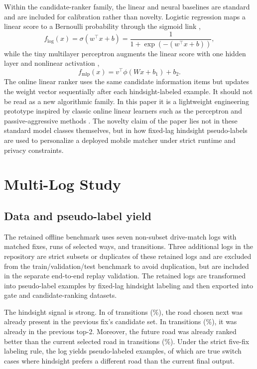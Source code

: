 \documentclass{article}
\begin{document}
Within the candidate-ranker family, the linear and neural baselines are standard and are included for calibration rather than novelty. Logistic regression maps a linear score to a Bernoulli probability through the sigmoid link \cite{cox1958binary},
\[
f_{\mathrm{log}}(x)=\sigma(w^\top x + b)=\frac{1}{1+\exp(-(w^\top x+b))},
\]
while the tiny multilayer perceptron augments the linear score with one hidden layer and nonlinear activation \cite{rumelhart1986backprop},
\[
f_{\mathrm{mlp}}(x)=v^\top \phi(Wx+b_1)+b_2.
\]
The online linear ranker uses the same candidate information items but updates the weight vector sequentially after each hindsight-labeled example. It should not be read as a new algorithmic family. In this paper it is a lightweight engineering prototype inspired by classic online linear learners such as the perceptron \cite{rosenblatt1958perceptron} and passive-aggressive methods \cite{crammer2006pa}. The novelty claim of the paper lies not in these standard model classes themselves, but in how fixed-lag hindsight pseudo-labels are used to personalize a deployed mobile matcher under strict runtime and privacy constraints.

\section{Multi-Log Study}
\subsection{Data and pseudo-label yield}
The retained offline benchmark uses seven non-subset drive-match logs with \CurrentLogRows{} matched fixes, \CurrentLogRunCount{} runs of selected ways, and \CurrentLogTransitions{} transitions. Three additional logs in the repository are strict subsets or duplicates of these retained logs and are excluded from the train/validation/test benchmark to avoid duplication, but are included in the separate end-to-end replay validation. The retained logs are transformed into pseudo-label examples by fixed-lag hindsight labeling and then exported into gate and candidate-ranking datasets.

The hindsight signal is strong. In \FutureCandidateCount{} of \CurrentLogTransitions{} transitions (\FutureCandidatePct{}\%), the road chosen next was already present in the previous fix's candidate set. In \FutureTopTwoCount{} transitions (\FutureTopTwoPct{}\%), it was already in the previous top-2. Moreover, the future road was already ranked better than the current selected road in \FutureRankedBetterCount{} transitions (\FutureRankedBetterPct{}\%). Under the strict five-fix labeling rule, the log yields \PseudoLabelExamples{} pseudo-labeled examples, of which \PseudoLabelSwitchCount{} are true switch cases where hindsight prefers a different road than the current final output.
\end{document}
